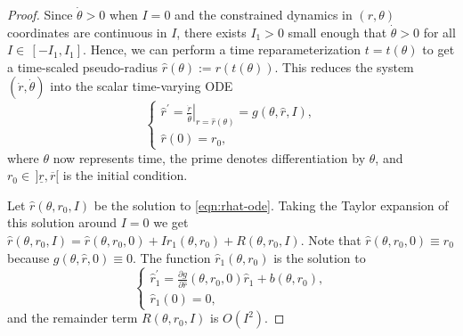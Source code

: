 \documentclass[journal,twoside,web, twocolumn,draftcls]{ieeecolor}
\begin{document}
\begin{proof}
    Since \(\dot{\theta} > 0\) when \(I = 0\) and the constrained dynamics 
    in \((r,\theta)\) coordinates are continuous in \(I\), there exists 
    \(I_1 > 0\) small enough that \(\dot{\theta} > 0\) for all
    \(I \in \, [-I_1,I_1]\).
    Hence, we can perform a time reparameterization \(t = t(\theta)\) to get a
    time-scaled pseudo-radius \(\hat{r}(\theta) := r(t(\theta))\).
    This reduces the system \((\dot{r},\dot{\theta})\) into the scalar
    time-varying ODE 
    \begin{equation}\label{eqn:rhat-ode}
        \begin{cases}
            \hat{r}^\prime= \left.\frac{\dot{r}}{\dot{\theta}}\right|_{r =
                \hat{r}(\theta)} = 
            g(\theta,\hat{r},I)
            , \\
            \hat{r}(0) = r_0
            ,
        \end{cases}
    \end{equation}
    where \(\theta\) now represents time,
    the prime denotes differentiation by \(\theta\), and
    \(r_0 \in \, ]\underline{r},\overline{r}[\) is the initial condition.

    Let \(\hat{r}(\theta,r_0,I)\) be the solution to \eqref{eqn:rhat-ode}.
    Taking the Taylor expansion of this solution around \(I = 0\) we get
    \(\hat{r}(\theta,r_0,I) = \hat{r}(\theta,r_0,0) + I\hat{r}_1(\theta,r_0) 
    + R(\theta,r_0,I)\). 
    Note that \(\hat{r}(\theta,r_0,0) \equiv r_0\) because
    \(g(\theta,\hat{r},0) \equiv 0\).
    The function \(\hat{r}_1(\theta,r_0)\) is the solution to
    \begin{equation}\label{eqn:r1-hat-prime}
        \begin{cases}
        \hat{r}_1^\prime = 
        \frac{\partial g}{\partial \hat{r}}(\theta,r_0,0)\hat{r}_1 +
        b(\theta,r_0)
        , \\
        \hat{r}_1(0) = 0
        ,
    \end{cases}
    \end{equation}
    and the remainder term \(R(\theta,r_0,I)\) is \(O(I^2)\).


\end{proof}
\end{document}
